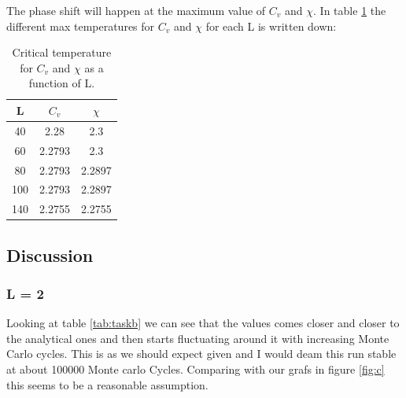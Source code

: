 \documentclass{article}
\begin{document}
The phase shift will happen at the maximum value of $C_v$ and $\chi$. In table \ref{tab:e} the different max temperatures for $C_v$ and $\chi$ for each L is written down:
\begin{table}
\centering
\caption{Critical temperature for $C_v$ and $\chi$ as a function of L.}
\begin{tabular}{c|c|c}
L & $C_v$ & $\chi$ \\ \hline
40 & 2.28 & 2.3 \\
60 & 2.2793 & 2.3 \\
80 & 2.2793 & 2.2897 \\
100 & 2.2793 & 2.2897 \\
140 & 2.2755 & 2.2755 \\
\end{tabular}
\label{tab:e}
\end{table}
\subsection*{Discussion}
\subsubsection*{L = 2}
Looking at table \ref{tab:taskb} we can see that the values comes closer and closer to the analytical ones and then starts fluctuating around it with increasing Monte Carlo cycles. This is as we should expect given and I would deam this run stable at about 100000 Monte carlo Cycles. Comparing with our grafs in figure \ref{fig:c} this seems to be a reasonable assumption.
\end{document}
